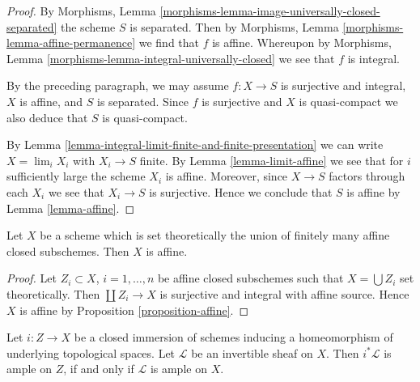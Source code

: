 \begin{proof}
By Morphisms, Lemma \ref{morphisms-lemma-image-universally-closed-separated}
the scheme $S$ is separated. Then by
Morphisms, Lemma \ref{morphisms-lemma-affine-permanence}
we find that $f$ is affine. Whereupon by
Morphisms, Lemma \ref{morphisms-lemma-integral-universally-closed}
we see that $f$ is integral.

\medskip\noindent
By the preceding paragraph, we may assume $f : X \to S$
is surjective and integral, $X$ is affine, and $S$ is separated.
Since $f$ is surjective and $X$ is quasi-compact we also deduce that $S$ is
quasi-compact.

\medskip\noindent
By Lemma \ref{lemma-integral-limit-finite-and-finite-presentation}
we can write $X = \lim_i X_i$ with $X_i \to S$ finite. By
Lemma \ref{lemma-limit-affine}
we see that for $i$ sufficiently large the scheme $X_i$ is affine.
Moreover, since $X \to S$ factors through each $X_i$ we see that
$X_i \to S$ is surjective. Hence we conclude that $S$ is affine by
Lemma \ref{lemma-affine}.
\end{proof}

\begin{lemma}
\label{lemma-affines-glued-in-closed-affine}
Let $X$ be a scheme which is set theoretically the union of
finitely many affine closed subschemes. Then $X$ is affine.
\end{lemma}

\begin{proof}
Let $Z_i \subset X$, $i = 1, \ldots, n$ be affine closed subschemes such that
$X = \bigcup Z_i$ set theoretically. Then $\coprod Z_i \to X$ is surjective
and integral with affine source. Hence $X$ is affine by
Proposition \ref{proposition-affine}.
\end{proof}

\begin{lemma}
\label{lemma-ample-on-reduction}
Let $i : Z \to X$ be a closed immersion of schemes
inducing a homeomorphism of underlying topological spaces.
Let $\mathcal{L}$ be an invertible sheaf on $X$.
Then $i^*\mathcal{L}$ is ample on $Z$, if and only if $\mathcal{L}$
is ample on $X$.
\end{lemma}

